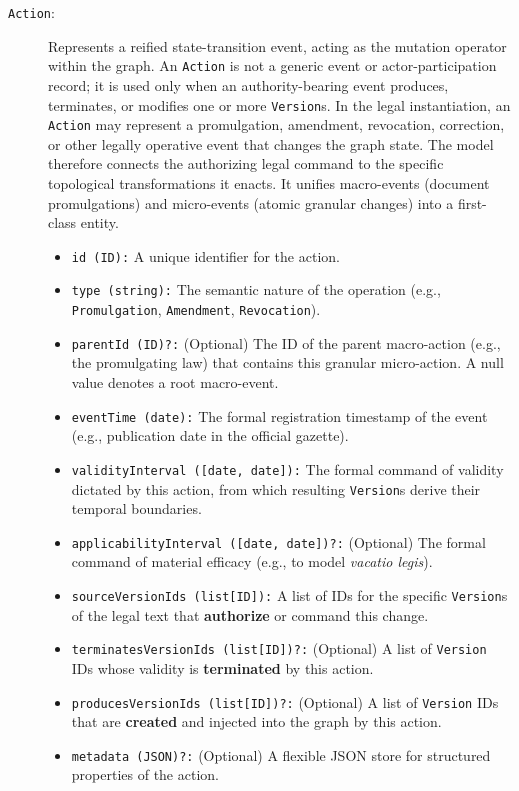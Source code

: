 \documentclass[11pt]{article}
\begin{document}
\begin{description}
    \item[\texttt{Action}:] Represents a reified state-transition event, acting as the mutation operator within the graph. An \texttt{Action} is not a generic event or actor-participation record; it is used only when an authority-bearing event produces, terminates, or modifies one or more \texttt{Version}s. In the legal instantiation, an \texttt{Action} may represent a promulgation, amendment, revocation, correction, or other legally operative event that changes the graph state. The model therefore connects the authorizing legal command to the specific topological transformations it enacts. It unifies macro-events (document promulgations) and micro-events (atomic granular changes) into a first-class entity. 
    \begin{itemize}
        \item \texttt{id (ID):} A unique identifier for the action.
        \item \texttt{type (string):} The semantic nature of the operation (e.g., \texttt{Promulgation}, \texttt{Amendment}, \texttt{Revocation}).
        \item \texttt{parentId (ID)?:} (Optional) The ID of the parent macro-action (e.g., the promulgating law) that contains this granular micro-action. A null value denotes a root macro-event.
        \item \texttt{eventTime (date):} The formal registration timestamp of the event (e.g., publication date in the official gazette).
        \item \texttt{validityInterval ([date, date]):} The formal command of validity dictated by this action, from which resulting \texttt{Version}s derive their temporal boundaries.
        \item \texttt{applicabilityInterval ([date, date])?:} (Optional) The formal command of material efficacy (e.g., to model \textit{vacatio legis}).
        \item \texttt{sourceVersionIds (list[ID]):} A list of IDs for the specific \texttt{Version}s of the legal text that \textbf{authorize} or command this change.
        \item \texttt{terminatesVersionIds (list[ID])?:} (Optional) A list of \texttt{Version} IDs whose validity is \textbf{terminated} by this action.
        \item \texttt{producesVersionIds (list[ID])?:} (Optional) A list of \texttt{Version} IDs that are \textbf{created} and injected into the graph by this action.
        \item \texttt{metadata (JSON)?:} (Optional) A flexible JSON store for structured properties of the action.
    \end{itemize}
    

\end{description}
\end{document}
